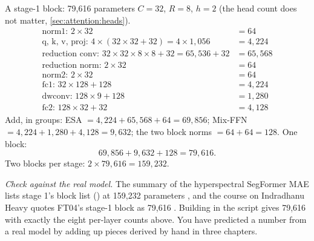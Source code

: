 \begin{worked}[label={we:block:stage1}]{A stage-1 block: 79{,}616 parameters}
$C = 32$, $R = 8$, $h = 2$ (the head count does not matter, \cref{sec:attention:heads}).
\begin{align*}
  \text{norm1: } 2\times32 &= 64\\
  \text{q, k, v, proj: } 4\times(32\times32 + 32) = 4\times1{,}056 &= 4{,}224\\
  \text{reduction conv: } 32\times32\times8\times8 + 32 = 65{,}536 + 32 &= 65{,}568\\
  \text{reduction norm: } 2\times32 &= 64\\
  \text{norm2: } 2\times32 &= 64\\
  \text{fc1: } 32\times128 + 128 &= 4{,}224\\
  \text{dwconv: } 128\times9 + 128 &= 1{,}280\\
  \text{fc2: } 128\times32 + 32 &= 4{,}128
\end{align*}
Add, in groups: ESA $= 4{,}224 + 65{,}568 + 64 = 69{,}856$; Mix-FFN $= 4{,}224 + 1{,}280 + 4{,}128 =
9{,}632$; the two block norms $= 64 + 64 = 128$. One block:
\[
  69{,}856 + 9{,}632 + 128 = 79{,}616 .
\]
Two blocks per stage: $2\times79{,}616 = 159{,}232$.

\emph{Check against the real model.} The  summary of the hyperspectral SegFormer
MAE lists stage 1's block list () at 159{,}232 parameters
, and the course on Indradhanu
Heavy quotes FT04's stage-1 block as 79{,}616 .
Building  in the script gives 79{,}616 with exactly the
eight per-layer counts above\tagC. You have predicted a number from a real model by adding up
pieces derived by hand in three chapters.
\end{worked}

